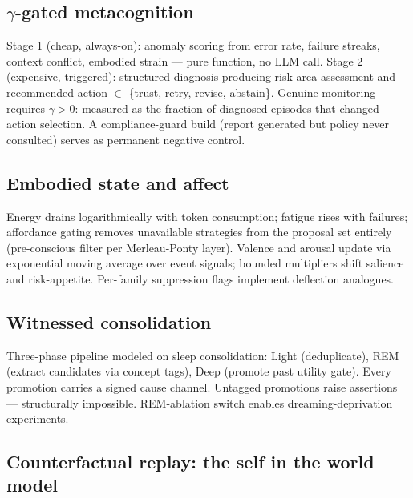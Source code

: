 \documentclass[11pt]{article}
\begin{document}
\subsection{$\gamma$-gated metacognition}

Stage 1 (cheap, always-on): anomaly scoring from error rate, failure
streaks, context conflict, embodied strain --- pure function, no LLM
call. Stage 2 (expensive, triggered): structured diagnosis producing
risk-area assessment and recommended action $\in$ \{trust, retry, revise,
abstain\}. Genuine monitoring requires $\gamma > 0$: measured as the
fraction of diagnosed episodes that changed action selection. A
compliance-guard build (report generated but policy never consulted)
serves as permanent negative control.

\subsection{Embodied state and affect}

Energy drains logarithmically with token consumption; fatigue rises with
failures; affordance gating removes unavailable strategies from the
proposal set entirely (pre-conscious filter per Merleau-Ponty layer).
Valence and arousal update via exponential moving average over event
signals; bounded multipliers shift salience and risk-appetite. Per-family
suppression flags implement deflection analogues.

\subsection{Witnessed consolidation}

Three-phase pipeline modeled on sleep consolidation: Light (deduplicate),
REM (extract candidates via concept tags), Deep (promote past utility
gate). Every promotion carries a signed cause channel. Untagged
promotions raise assertions --- structurally impossible. REM-ablation
switch enables dreaming-deprivation experiments.

\subsection{Counterfactual replay: the self in the world model}
\end{document}
